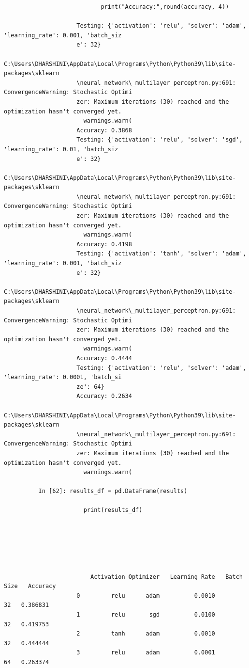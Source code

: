 \documentclass[12pt,a4paper]{article}
\begin{document}
\begin{lstlisting}
                            print("Accuracy:",round(accuracy, 4))

                     Testing: {'activation': 'relu', 'solver': 'adam', 'learning_rate': 0.001, 'batch_siz
                     e': 32}
                     C:\Users\DHARSHINI\AppData\Local\Programs\Python\Python39\lib\site-packages\sklearn
                     \neural_network\_multilayer_perceptron.py:691: ConvergenceWarning: Stochastic Optimi
                     zer: Maximum iterations (30) reached and the optimization hasn't converged yet.
                       warnings.warn(
                     Accuracy: 0.3868
                     Testing: {'activation': 'relu', 'solver': 'sgd', 'learning_rate': 0.01, 'batch_siz
                     e': 32}
                     C:\Users\DHARSHINI\AppData\Local\Programs\Python\Python39\lib\site-packages\sklearn
                     \neural_network\_multilayer_perceptron.py:691: ConvergenceWarning: Stochastic Optimi
                     zer: Maximum iterations (30) reached and the optimization hasn't converged yet.
                       warnings.warn(
                     Accuracy: 0.4198
                     Testing: {'activation': 'tanh', 'solver': 'adam', 'learning_rate': 0.001, 'batch_siz
                     e': 32}
                     C:\Users\DHARSHINI\AppData\Local\Programs\Python\Python39\lib\site-packages\sklearn
                     \neural_network\_multilayer_perceptron.py:691: ConvergenceWarning: Stochastic Optimi
                     zer: Maximum iterations (30) reached and the optimization hasn't converged yet.
                       warnings.warn(
                     Accuracy: 0.4444
                     Testing: {'activation': 'relu', 'solver': 'adam', 'learning_rate': 0.0001, 'batch_si
                     ze': 64}
                     Accuracy: 0.2634
                     C:\Users\DHARSHINI\AppData\Local\Programs\Python\Python39\lib\site-packages\sklearn
                     \neural_network\_multilayer_perceptron.py:691: ConvergenceWarning: Stochastic Optimi
                     zer: Maximum iterations (30) reached and the optimization hasn't converged yet.
                       warnings.warn(

          In [62]: results_df = pd.DataFrame(results)

                       print(results_df)






                         Activation Optimizer   Learning Rate   Batch Size   Accuracy
                     0         relu      adam          0.0010           32   0.386831
                     1         relu       sgd          0.0100           32   0.419753
                     2         tanh      adam          0.0010           32   0.444444
                     3         relu      adam          0.0001           64   0.263374


\end{lstlisting}
\end{document}
